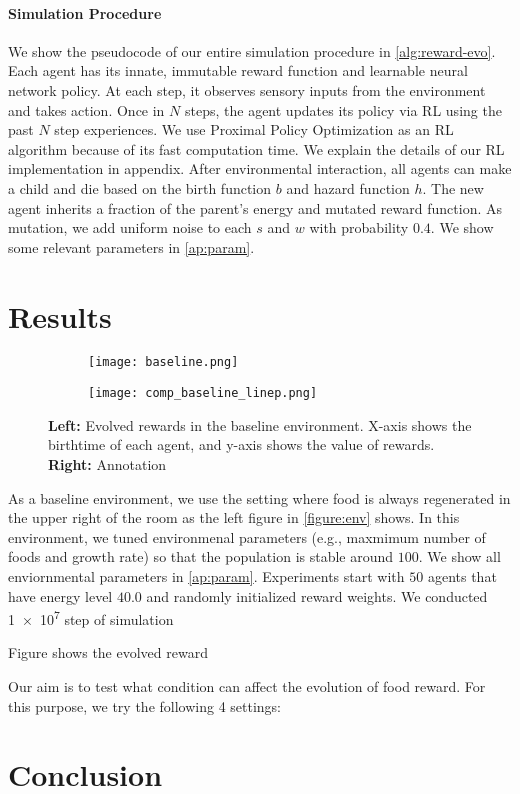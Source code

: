 \paragraph{Simulation Procedure}
We show the pseudocode of our entire simulation procedure in \cref{alg:reward-evo}. Each agent has its innate, immutable reward function and learnable neural network policy. At each step, it observes sensory inputs from the environment and takes action. Once in $N$ steps, the agent updates its policy via RL using the past $N$ step experiences. We use Proximal Policy Optimization \citep{schulmanProximalPolicyOptimization2017} as an RL algorithm because of its fast computation time. We explain the details of our RL implementation in appendix. After environmental interaction, all agents can make a child and die based on the birth function $b$ and hazard function $h$. The new agent inherits a fraction of the parent's energy and mutated reward function. As mutation, we add uniform noise to each $s$ and $w$ with probability $0.4$. We show some relevant parameters in \cref{ap:param}.

\section{Results}

\begin{figure}[t]
  \begin{subfigure}[t]{7cm}
    \centering
    \texttt{[image: baseline.png]}
  \end{subfigure}
  \begin{subfigure}[t]{8cm}
    \centering
    \texttt{[image: comp\_baseline\_linep.png]}
  \end{subfigure}
  \caption{
    \textbf{Left:} Evolved rewards in the baseline environment. X-axis shows the birthtime of each agent, and y-axis shows the value of rewards.
    \textbf{Right:} Annotation
  }\label{figure:baseline-result}
\end{figure}

As a baseline environment, we use the setting where food is always regenerated in the upper right of the room as the left figure in \cref{figure:env} shows. In this environment, we tuned environmenal parameters (e.g., maxmimum number of foods and growth rate) so that the population is stable around $100$. We show all enviornmental parameters in \cref{ap:param}.
Experiments start with $50$ agents that have energy level $40.0$ and randomly initialized reward weights. We conducted \num{1e7} step of simulation

Figure shows the evolved reward 


Our aim is to test what condition can affect the evolution of food reward. For this purpose, we try the following 4 settings: 

\section{Conclusion}